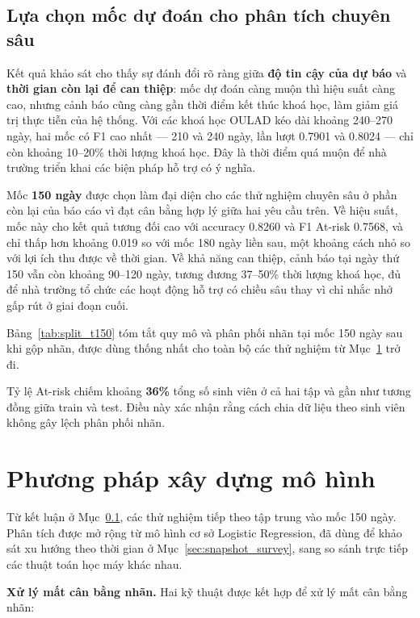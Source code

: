\documentclass[a4paper]{report}
\begin{document}
\subsection{Lựa chọn mốc dự đoán cho phân tích chuyên sâu}
\label{sec:choose_t150}

Kết quả khảo sát cho thấy sự đánh đổi rõ ràng giữa \textbf{độ tin cậy của dự
báo} và \textbf{thời gian còn lại để can thiệp}: mốc dự đoán càng muộn thì
hiệu suất càng cao, nhưng cảnh báo cũng càng gần thời điểm kết thúc khoá học,
làm giảm giá trị thực tiễn của hệ thống. Với các khoá học OULAD kéo dài khoảng
240--270 ngày, hai mốc có F1 cao nhất --- 210 và 240 ngày, lần lượt 0.7901 và
0.8024 --- chỉ còn khoảng 10--20\% thời lượng khoá học. Đây là thời điểm quá
muộn để nhà trường triển khai các biện pháp hỗ trợ có ý nghĩa.

Mốc \textbf{150 ngày} được chọn làm đại diện cho các thử nghiệm chuyên sâu ở
phần còn lại của báo cáo vì đạt cân bằng hợp lý giữa hai yêu cầu trên. Về hiệu
suất, mốc này cho kết quả tương đối cao với accuracy 0.8260 và F1 At-risk 0.7568,
và chỉ thấp hơn khoảng 0.019 so với mốc 180 ngày liền sau, một khoảng cách nhỏ
so với lợi ích thu được về thời gian. Về khả năng can thiệp, cảnh báo tại ngày
thứ 150 vẫn còn khoảng 90--120 ngày, tương đương 37--50\% thời lượng khoá học,
đủ để nhà trường tổ chức các hoạt động hỗ trợ có chiều sâu thay vì chỉ nhắc
nhở gấp rút ở giai đoạn cuối.

Bảng~\ref{tab:split_t150} tóm tắt quy mô và phân phối nhãn tại mốc 150 ngày
sau khi gộp nhãn, được dùng thống nhất cho toàn bộ các thử nghiệm từ
Mục~\ref{sec:methodology} trở đi.



Tỷ lệ At-risk chiếm khoảng \textbf{36\%} tổng số sinh viên ở cả hai tập và gần
như tương đồng giữa train và test. Điều này xác nhận rằng cách chia dữ liệu
theo sinh viên không gây lệch phân phối nhãn.

\section{Phương pháp xây dựng mô hình}
\label{sec:methodology}

Từ kết luận ở Mục~\ref{sec:choose_t150}, các thử nghiệm tiếp theo tập trung
vào mốc 150 ngày. Phân tích được mở rộng từ mô hình cơ sở Logistic Regression,
đã dùng để khảo sát xu hướng theo thời gian ở Mục~\ref{sec:snapshot_survey},
sang so sánh trực tiếp các thuật toán học máy khác nhau.

\medskip
\noindent\textbf{Xử lý mất cân bằng nhãn.} Hai kỹ thuật được kết hợp để xử lý
mất cân bằng nhãn:
\end{document}
